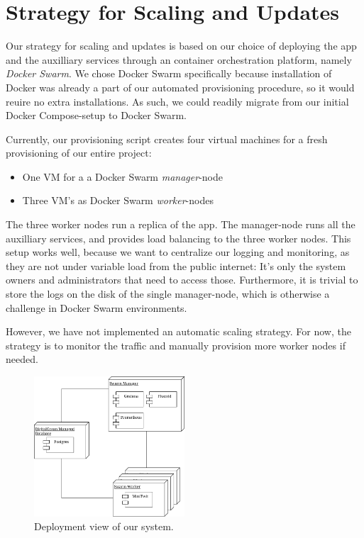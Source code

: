 \section{Strategy for Scaling and Updates}\label{sec:scaling}

Our strategy for scaling and updates is based on our choice of deploying the app and the auxilliary services through an container orchestration platform, namely \textit{Docker Swarm}. We chose Docker Swarm specifically because installation of Docker was already a part of our automated provisioning procedure, so it would reuire no extra installations.
As such, we could readily migrate from our initial Docker Compose-setup to Docker Swarm.

Currently, our provisioning script creates four virtual machines for a fresh provisioning of our entire project:

\begin{itemize}
	\item One VM for a a Docker Swarm \textit{manager}-node
	\item Three VM's as Docker Swarm \textit{worker}-nodes
\end{itemize}

The three worker nodes run a replica of the app.
The manager-node runs all the auxilliary services, and provides load balancing to the three worker nodes.
This setup works well, because we want to centralize our logging and monitoring, as they are not under variable load from the public internet: It's only the system owners and administrators that need to access those.
Furthermore, it is trivial to store the logs on the disk of the single manager-node, which is otherwise a challenge in Docker Swarm environments.

However, we have not implemented an automatic scaling strategy. For now, the strategy is to monitor the traffic and manually provision more worker nodes if needed.

\begin{figure}
	\begin{center}
		\includegraphics[width=0.50\textwidth]{img/deployment.pdf}
	\end{center}
	\caption{Deployment view of our system.}\label{fig:deployment}
\end{figure}

